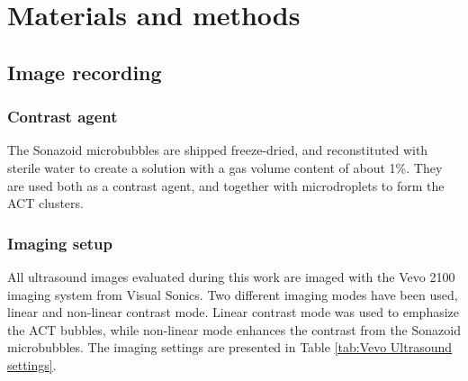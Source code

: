 \section{Materials and methods}
\subsection{Image recording}
\subsubsection{Contrast agent}
The Sonazoid\texttrademark{} microbubbles are shipped freeze-dried, and reconstituted with sterile water to create a solution with a gas volume content of about 1\%. They are used both as a contrast agent, and together with microdroplets to form the ACT\texttrademark{} clusters.  %

\subsubsection{Imaging setup}
All ultrasound images evaluated during this work are imaged with the Vevo\texttrademark{} 2100 imaging system from Visual Sonics.
Two different imaging modes have been used, linear and non-linear contrast mode. Linear contrast mode was used to emphasize the ACT\texttrademark{} bubbles, while non-linear mode enhances the contrast from the Sonazoid\texttrademark{} microbubbles. The imaging settings are presented in Table \ref{tab:Vevo Ultrasound settings}.

